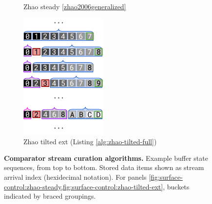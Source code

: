 \begin{figure}
\begin{subfigure}{0.25\linewidth}
\caption{Zhao steady \ref{zhao2006generalized}}
\label{fig:surface-control:zhao-steady}
\end{subfigure}%
\begin{subfigure}{0.25\linewidth}
\centering
\includegraphics[height=2.5in]{img/surface-control-zhao-tilted-ext}
\caption{Zhao tilted ext (Listing \ref{alg:zhao-tilted-full})}
\label{fig:surface-control:zhao-tilted-ext}
\end{subfigure}%

\caption{%
\textbf{Comparator stream curation algorithms.}
\footnotesize
Example buffer state sequences, from top to bottom.
Stored data items shown as stream arrival index (hexidecimal notation).
For panels \cref{fig:surface-control:zhao-steady,fig:surface-control:zhao-tilted-ext}, buckets indicated by braced groupings.
}
\label{fig:surface-control}

\end{figure}
